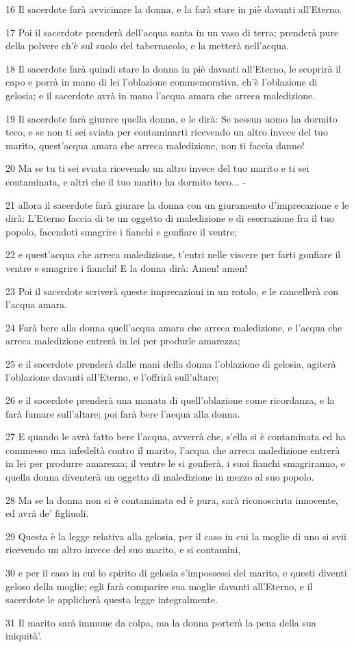 \par 16 Il sacerdote farà avvicinare la donna, e la farà stare in piè davanti all'Eterno.
\par 17 Poi il sacerdote prenderà dell'acqua santa in un vaso di terra; prenderà pure della polvere ch'è sul suolo del tabernacolo, e la metterà nell'acqua.
\par 18 Il sacerdote farà quindi stare la donna in piè davanti all'Eterno, le scoprirà il capo e porrà in mano di lei l'oblazione commemorativa, ch'è l'oblazione di gelosia; e il sacerdote avrà in mano l'acqua amara che arreca maledizione.
\par 19 Il sacerdote farà giurare quella donna, e le dirà: Se nessun uomo ha dormito teco, e se non ti sei sviata per contaminarti ricevendo un altro invece del tuo marito, quest'acqua amara che arreca maledizione, non ti faccia danno!
\par 20 Ma se tu ti sei sviata ricevendo un altro invece del tuo marito e ti sei contaminata, e altri che il tuo marito ha dormito teco... -
\par 21 allora il sacerdote farà giurare la donna con un giuramento d'imprecazione e le dirà: L'Eterno faccia di te un oggetto di maledizione e di esecrazione fra il tuo popolo, facendoti smagrire i fianchi e gonfiare il ventre;
\par 22 e quest'acqua che arreca maledizione, t'entri nelle viscere per farti gonfiare il ventre e smagrire i fianchi! E la donna dirà: Amen! amen!
\par 23 Poi il sacerdote scriverà queste imprecazioni in un rotolo, e le cancellerà con l'acqua amara.
\par 24 Farà bere alla donna quell'acqua amara che arreca maledizione, e l'acqua che arreca maledizione entrerà in lei per produrle amarezza;
\par 25 e il sacerdote prenderà dalle mani della donna l'oblazione di gelosia, agiterà l'oblazione davanti all'Eterno, e l'offrirà sull'altare;
\par 26 e il sacerdote prenderà una manata di quell'oblazione come ricordanza, e la farà fumare sull'altare; poi farà bere l'acqua alla donna.
\par 27 E quando le avrà fatto bere l'acqua, avverrà che, s'ella si è contaminata ed ha commesso una infedeltà contro il marito, l'acqua che arreca maledizione entrerà in lei per produrre amarezza; il ventre le si gonfierà, i suoi fianchi smagriranno, e quella donna diventerà un oggetto di maledizione in mezzo al suo popolo.
\par 28 Ma se la donna non si è contaminata ed è pura, sarà riconosciuta innocente, ed avrà de' figliuoli.
\par 29 Questa è la legge relativa alla gelosia, per il caso in cui la moglie di uno si svii ricevendo un altro invece del suo marito, e si contamini,
\par 30 e per il caso in cui lo spirito di gelosia s'impossessi del marito, e questi diventi geloso della moglie; egli farà comparire sua moglie davanti all'Eterno, e il sacerdote le applicherà questa legge integralmente.
\par 31 Il marito sarà immune da colpa, ma la donna porterà la pena della sua iniquità'.

